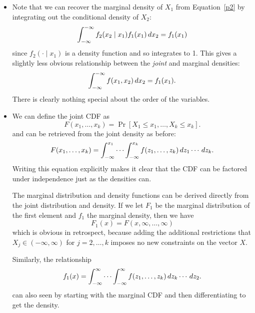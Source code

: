 \begin{itemize}
\item Note that we can recover the marginal density of $X_1$ from
  Equation~\eqref{p2} by integrating out the conditional density of
  $X_2$:
  \begin{equation*}
    \int_{-\infty}^{-\infty} f_2(x_2 \mid x_1) f_1(x_1) \,dx_2 = f_1(x_1)
  \end{equation*}
  since $f_2(\cdot \mid x_1)$ is a density function and so integrates to 1.
  This gives a slightly less obvious relationship between the
  \emph{joint} and marginal densities:
  \begin{equation*}
    \int_{-\infty}^{-\infty} f(x_1, x_2) \,dx_2 = f_1(x_1).
  \end{equation*}
  There is clearly nothing special about the order of the variables.

\item We can define the joint CDF as
  \begin{equation*}
    F(x_1,\dots,x_k) = \Pr[X_1 \leq x_1,\dots, X_k \leq x_k].
  \end{equation*}
  and can be retrieved from the joint density as before:
  \begin{equation*}
    F(x_1,\dots,x_k) = \int_{-\infty}^{x_1} \cdots \int_{-\infty}^{x_k} f(z_1,\dots,z_k) \,dz_1 \cdots \,dz_k.
  \end{equation*}
  Writing this equation explicitly makes it clear that the CDF can be
  factored under independence just as the densities can.

  The marginal distribution and density functions can be derived
  directly from the joint distribution and density.  If we let $F_1$ be
  the marginal distribution of the first element and $f_1$ the marginal
  density, then we have
  \begin{equation*}
    F_1(x) = F(x, \infty,\dots,\infty)
  \end{equation*}
  which is obvious in retrospect, because adding the additional
  restrictions that $X_j \in (-\infty, \infty)$ for $j = 2,\dots,k$ imposes no new
  constraints on the vector $X$.

  Similarly, the relationship
  \begin{equation*}
    f_1(x) = \int_{-\infty}^\infty \cdots \int_{-\infty}^\infty f(z_1,\dots,z_k) \,dz_k \cdots \,dz_2.
  \end{equation*}
  can also seen by starting with the marginal CDF and then
  differentiating to get the density.

\end{itemize}


